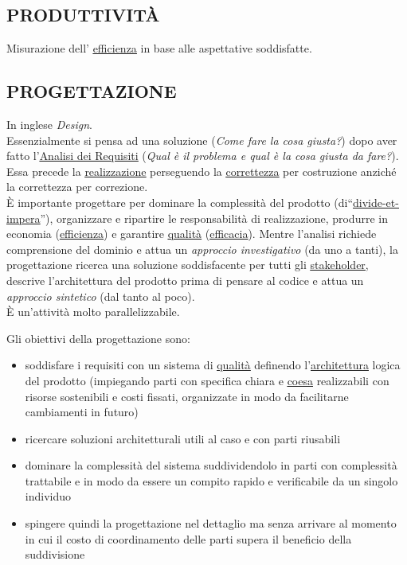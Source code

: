 		\subsection{PRODUTTIVITÀ}  \label{produttivita}
		Misurazione dell' \underline{\hyperref[efficienza]{efficienza}} in base alle aspettative soddisfatte.


		\subsection{PROGETTAZIONE}  \label{progettazione} %
		In inglese \textit{Design}. \\
		Essenzialmente si pensa ad una soluzione (\textit{Come fare la cosa giusta?}) dopo aver fatto l'\underline{\hyperref[analisideirequisiti]{Analisi dei Requisiti}} (\textit{Qual è il problema e qual è la cosa giusta da fare?}). Essa precede la \underline{\hyperref[realizzazione]{realizzazione}} perseguendo la \underline{\hyperref[correttezza]{correttezza}} per costruzione anziché la correttezza per correzione. \\
		È importante progettare per dominare la complessità del prodotto (di“\underline{\hyperref[divideetimpera]{divide-et-impera}}”), organizzare e ripartire le responsabilità di realizzazione, produrre in economia (\underline{\hyperref[efficienza]{efficienza}}) e garantire \underline{\hyperref[qualita]{qualità}} (\underline{\hyperref[efficacia]{efficacia}}). Mentre l'analisi richiede comprensione del dominio e attua un \textit{approccio investigativo} (da uno a tanti), la progettazione ricerca una soluzione soddisfacente per tutti gli \underline{\hyperref[stakeholder]{stakeholder}}, descrive l'architettura del prodotto prima di pensare al codice e attua un \textit{approccio sintetico} (dal tanto al poco). \\
		È un'attività molto parallelizzabile.

		Gli obiettivi della progettazione sono:
		\begin{itemize}
			\item soddisfare i requisiti con un sistema di \underline{\hyperref[qualita]{qualità}} definendo l'\underline{\hyperref[architettura]{architettura}} logica del prodotto (impiegando parti con specifica chiara e \underline{\hyperref[coeso]{coesa}} realizzabili con risorse sostenibili e costi fissati, organizzate in modo da facilitarne cambiamenti in futuro)
			\item ricercare soluzioni architetturali utili al caso e con parti riusabili
			\item  dominare la complessità del sistema suddividendolo in parti con complessità trattabile e in modo da essere un compito rapido e verificabile da un singolo individuo
			\item spingere quindi la progettazione nel dettaglio ma senza arrivare al momento in cui il costo di coordinamento delle parti supera il beneficio della suddivisione
		\end{itemize}

